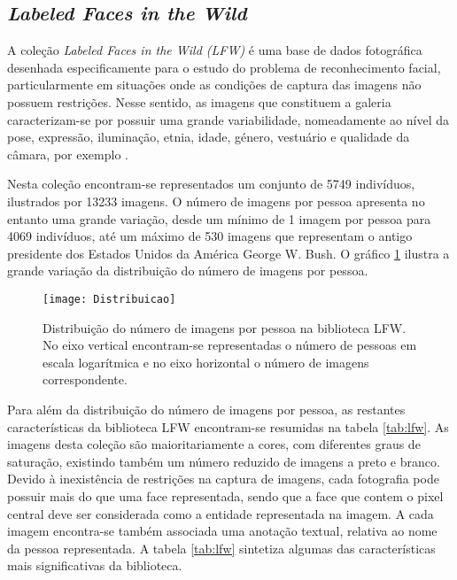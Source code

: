 \subsection{\textit{Labeled Faces in the Wild}}  \label{sec:lfw}
A coleção \textit{Labeled Faces in the Wild (LFW)} é uma base de dados fotográfica desenhada especificamente para o estudo do problema de reconhecimento facial, particularmente em situações onde as condições de captura das imagens não possuem restrições. Nesse sentido, as imagens que constituem a galeria caracterizam-se por possuir uma grande variabilidade, nomeadamente ao nível da pose, expressão, iluminação, etnia, idade, género, vestuário e qualidade da câmara, por exemplo \cite{Huang2007}.

Nesta coleção encontram-se representados um conjunto de 5749 indivíduos, ilustrados por 13233 imagens. O número de imagens por pessoa apresenta no entanto uma grande variação, desde um mínimo de 1 imagem por pessoa para 4069 indivíduos, até um máximo de 530 imagens que representam o antigo presidente dos Estados Unidos da América George W. Bush. O gráfico \ref{fig:distribuicaoLFW} ilustra a grande variação da distribuição do número de imagens por pessoa.

\begin{figure}[ht]
  \begin{center}
    \leavevmode
    \texttt{[image: Distribuicao]}
    \caption{Distribuição do número de imagens por pessoa na biblioteca LFW. No eixo vertical encontram-se representadas o número de pessoas em escala logarítmica e no eixo horizontal o número de imagens correspondente.}
    \label{fig:distribuicaoLFW}
  \end{center}
\end{figure}

Para além da distribuição do número de imagens por pessoa, as restantes características da biblioteca LFW encontram-se resumidas na tabela \ref{tab:lfw}. 
As imagens desta coleção são maioritariamente a cores, com diferentes graus de saturação, existindo também um número reduzido de imagens a preto e branco. Devido à inexistência de restrições na captura de imagens, cada fotografia pode possuir mais do que uma face representada, sendo que a face que contem o pixel central deve ser considerada como a entidade representada na imagem. A cada imagem encontra-se também associada uma anotação textual, relativa ao nome da pessoa representada. A tabela \ref{tab:lfw} sintetiza algumas das características mais significativas da biblioteca.

